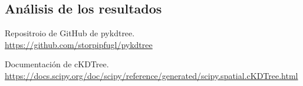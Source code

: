 \documentclass[11pt,a4paper]{article}
\begin{document}
\subsection{Análisis de los resultados}

\newpage

\begin{thebibliography}{5}

Repositroio de GitHub de pykdtree.
\\\url{https://github.com/storpipfugl/pykdtree}

Documentación de cKDTree.
\\\url{https://docs.scipy.org/doc/scipy/reference/generated/scipy.spatial.cKDTree.html}

\end{thebibliography}
\end{document}
